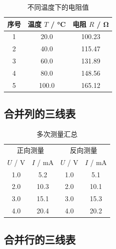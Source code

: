 \documentclass{Phyport}
\begin{document}
\begin{table}[H]
    \centering
    \caption{不同温度下的电阻值}
    \label{tab:siunitx}
    \begin{tabular}{c S[table-format=3.1] S[table-format=4.2]}
        \toprule
        序号 & {温度 $T$ / \si{\degreeCelsius}} & {电阻 $R$ / \si{\ohm}} \\
         &  20.0 &  100.23 \\
        2 &  40.0 &  115.47 \\
        3 &  60.0 &  131.89 \\
        4 &  80.0 &  148.56 \\
        5 & 100.0 &  165.12 \\
        \bottomrule
    \end{tabular}
\end{table}

\subsection{合并列的三线表}

\begin{table}[H]
    \centering
    \caption{多次测量汇总}
    \label{tab:multicolumn}
    \begin{tabular}{cccc}
        \toprule
        \multicolumn{2}{c}{正向测量} & \multicolumn{2}{c}{反向测量} \\
        \cmidrule(lr){1-2} \cmidrule(lr){3-4}
        $U$ / V & $I$ / mA & $U$ / V & $I$ / mA \\
        \midrule
        1.0 & 5.2  & 1.0 & 5.1 \\
        2.0 & 10.3 & 2.0 & 10.1 \\
        3.0 & 15.1 & 3.0 & 15.3 \\
        4.0 & 20.4 & 4.0 & 20.2 \\
        \bottomrule
    \end{tabular}
\end{table}

\subsection{合并行的三线表}
\end{document}
